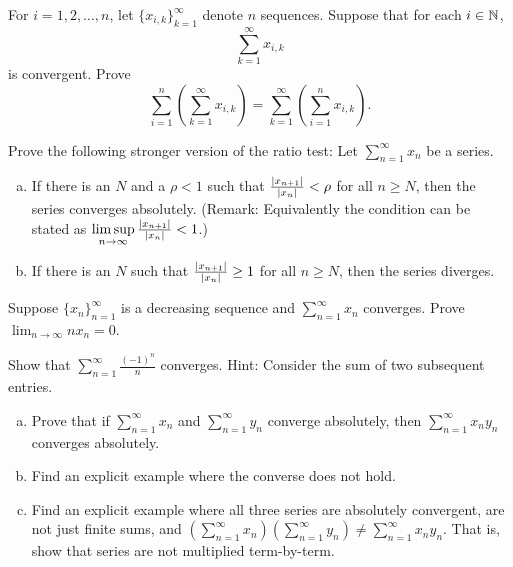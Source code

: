 \begin{exercise}
For $i=1,2,\ldots,n$, let $\{ x_{i,k} \}_{k=1}^\infty$ denote $n$
sequences.  Suppose that for each $i \in {\mathbb{N}}$,
\begin{equation*}
\sum_{k=1}^\infty x_{i,k}
\end{equation*}
is convergent.  Prove
\begin{equation*}
\sum_{i=1}^n \left( \sum_{k=1}^\infty x_{i,k} \right)
=
\sum_{k=1}^\infty \left( \sum_{i=1}^n x_{i,k} \right) .
\end{equation*}
\end{exercise}

\begin{exercise} \label{exercise:strongerratiotest}
Prove the following stronger version of the ratio test:
Let $\sum_{n=1}^\infty x_n$ be a series.
\begin{enumerate}[a)]
\item
If there is an $N$ and a $\rho < 1$ such that
$\frac{\left\lvert {x_{n+1}} \right\rvert}{\left\lvert {x_n} \right\rvert} < \rho$ for all $n \geq N$,
then the series converges absolutely.
(Remark: Equivalently the condition can be stated as
$\limsup\limits_{n\to\infty} \frac{\left\lvert {x_{n+1}} \right\rvert}{\left\lvert {x_n} \right\rvert} < 1$.)
\item
If there is an $N$ such that
$\frac{\left\lvert {x_{n+1}} \right\rvert}{\left\lvert {x_n} \right\rvert} \geq 1$
for all $n \geq N$,
then the series diverges. 
\end{enumerate}
\end{exercise}

\begin{exercise}[Challenging]
Suppose $\{ x_n \}_{n=1}^\infty$ is a decreasing sequence and
$\sum_{n=1}^\infty x_n$ converges.
Prove $\displaystyle \lim_{n\to\infty} n x_n = 0$.
\end{exercise}

\begin{exercise}
Show that $\displaystyle \sum_{n=1}^\infty \frac{{(-1)}^n}{n}$ converges.
Hint: Consider the sum of two subsequent entries.
\end{exercise}

\begin{exercise}
\leavevmode
\begin{enumerate}[a)]
\item Prove that if $\sum_{n=1}^\infty x_n$ and $\sum_{n=1}^\infty y_n$ converge absolutely, then
$\sum_{n=1}^\infty x_ny_n$ converges absolutely.
\item Find an explicit example where the converse does not hold.
\item Find an explicit example where all three series are absolutely convergent,
are not just finite sums,
and $\left(\sum_{n=1}^\infty x_n\right)\left(\sum_{n=1}^\infty y_n\right)
\not= \sum_{n=1}^\infty x_ny_n$.  That is, show that series are
not multiplied term-by-term.
\end{enumerate}
\end{exercise}

